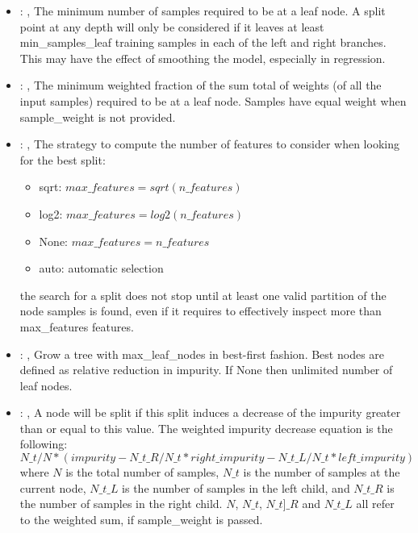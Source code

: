 \begin{itemize}
    \item {}: , 
      The minimum number of samples required to be at a leaf node. A split point at any
      depth will only be considered if it leaves at least min\_samples\_leaf training samples in
      each                                                  of the left and right branches. This may
      have the effect of smoothing the model, especially
      in regression.

    \item {}: , 
      The minimum weighted fraction of the sum total of weights (of all the input samples)
      required to be at a leaf node. Samples have equal weight when sample\_weight is not provided.

    \item {}: , 
      The strategy to compute the number of features to consider when looking for the best split:
      \begin{itemize}                                                     \item sqrt:
      $max\_features=sqrt(n\_features)$                                                     \item
      log2: $max\_features=log2(n\_features)$
      \item None: $max\_features=n\_features$
      \item auto: automatic selection
      \end{itemize}                                                   \nb the search for a split
      does not stop until at least one valid partition of the node
      samples is found, even if it requires to effectively inspect more than max\_features features.

    \item {}: , 
      Grow a tree with max\_leaf\_nodes in best-first fashion. Best nodes are defined as relative
      reduction                                                  in impurity. If None then unlimited
      number of leaf nodes.

    \item {}: , 
      A node will be split if this split induces a decrease of the impurity greater than or equal to
      this value.                                                  The weighted impurity decrease
      equation is the following:                                                  $N\_t / N *
      (impurity - N\_t\_R / N\_t * right\_impurity - N\_t\_L / N\_t * left\_impurity)$
      where $N$ is the total number of samples, $N\_t$ is the number of samples at the current node,
      $N\_t\_L$ is the number                                                  of samples in the
      left child, and $N\_t\_R$ is the number of samples in the right child.
      $N$, $N\_t$, $N\_t]\_R$ and $N\_t\_L$ all refer to the weighted sum, if sample\_weight is
      passed.


\end{itemize}
